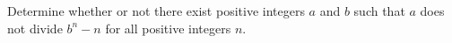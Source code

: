 Determine whether or not there exist positive integers $ a$ and $ b$ such that $ a$ does not divide $ b^n - n$ for all positive integers $ n$.